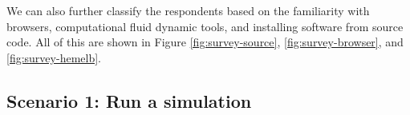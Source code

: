 \noindent%
\begin{minipage}{\linewidth}%
 \label{fig:survey-hemelb}%
\end{minipage}

\vspace{1cm}


We can also further classify the respondents based on the familiarity with browsers, computational fluid dynamic tools, and installing software from source code. All of this are shown in Figure \ref{fig:survey-source}, \ref{fig:survey-browser}, and \ref{fig:survey-hemelb}.




\subsection{Scenario 1: Run a simulation}

\vspace{1cm}

\noindent%
\begin{minipage}{\linewidth}%
 \label{fig:survey-s1-usability}%
\end{minipage}

